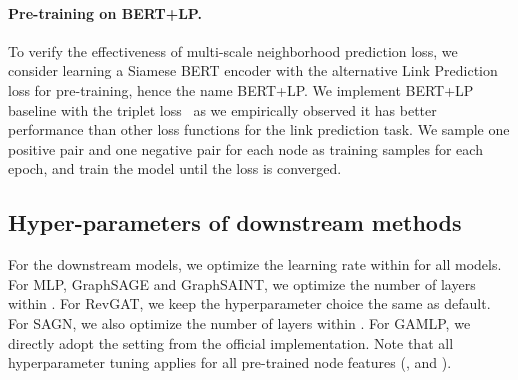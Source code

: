\documentclass{article} \usepackage{iclr2022_conference,times}
\begin{document}
\begin{table*}[h]
    \centering
    \caption{Hyper-parameters of GIANT-XRT.
         defines the structures of the hierarchical label trees.
         is the maximum learning rate in pre-training.
         is the number of optimization steps for each layer of HLT, respectively.
         is total number of batch size when using  Nvidia V100 GPUs.
         is the negative sampling strategy in XR-Transformer.
         is the th layer of  where we take the Transformer encoder to generate node embeddings as input for downstream GNN models.}
    \label{tb:xrt-hparams}
\end{table*}

\paragraph{Pre-training on BERT+LP.}
To verify the effectiveness of multi-scale neighborhood prediction loss, we consider learning a Siamese BERT encoder with the alternative Link Prediction loss for pre-training, hence the name BERT+LP.
We implement BERT+LP baseline with the triplet loss~\citep{balntas2016learning} as we empirically observed it has better performance than other loss functions for the link prediction task. 
We sample one positive pair and one negative pair for each node as training samples for each epoch, and train the model until the loss is converged.


\subsection{Hyper-parameters of downstream methods}
For the downstream models, we optimize the learning rate within  for all models. For MLP, GraphSAGE and GraphSAINT, we optimize the number of layers within . For RevGAT, we keep the hyperparameter choice the same as default. For SAGN, we also optimize the number of layers within . For GAMLP, we directly adopt the setting from the official implementation. Note that all hyperparameter tuning applies for all pre-trained node features (,  and ). 
\end{document}
